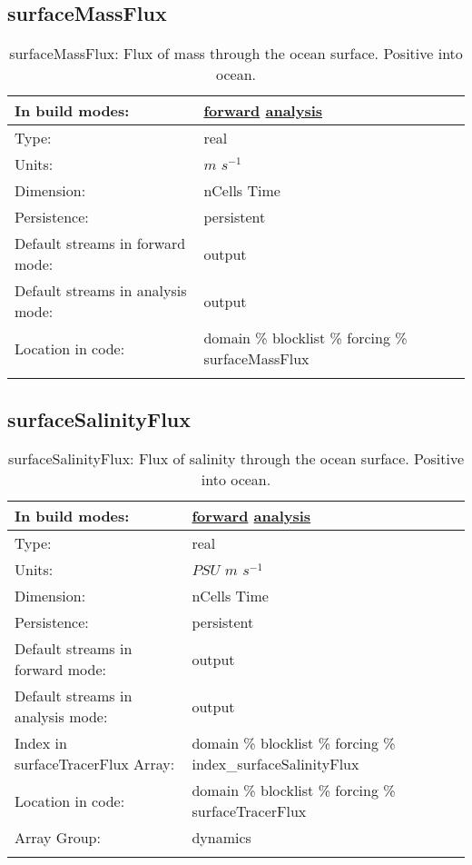 \subsection[surfaceMassFlux]{surfaceMassFlux}
\label{subsec:var_sec_forcing_surfaceMassFlux}
\begin{center}
\begin{longtable}{| p{2.0in} | p{4.0in} |}
        \hline 
        In build modes: & \hyperref[subsec:forward_var_tab_forcing]{forward} \hyperref[subsec:analysis_var_tab_forcing]{analysis} \\
        \hline 
        Type: & real \\
        \hline 
        Units: & $m$ $s^{-1}$ \\
        \hline 
        Dimension: & nCells Time \\
        \hline 
        Persistence: & persistent \\
        \hline 
		 Default streams in forward mode: &  output \\
        \hline 
		 Default streams in analysis mode: &  output \\
        \hline 
		 Location in code: & domain \% blocklist \% forcing \% surfaceMassFlux \\
		 \hline 
    \caption{surfaceMassFlux: Flux of mass through the ocean surface. Positive into ocean.}
\end{longtable}
\end{center}
\subsection[surfaceSalinityFlux]{surfaceSalinityFlux}
\label{subsec:var_sec_forcing_surfaceSalinityFlux}
\begin{center}
\begin{longtable}{| p{2.0in} | p{4.0in} |}
        \hline 
        In build modes: & \hyperref[subsec:forward_var_tab_forcing]{forward} \hyperref[subsec:analysis_var_tab_forcing]{analysis} \\
        \hline 
        Type: & real \\
        \hline 
        Units: & $PSU$ $m$ $s^{-1}$ \\
        \hline 
        Dimension: & nCells Time \\
        \hline 
        Persistence: & persistent \\
        \hline 
		 Default streams in forward mode: &  output \\
        \hline 
		 Default streams in analysis mode: &  output \\
        \hline 
		 Index in surfaceTracerFlux Array: & domain \% blocklist \% forcing \% index\_surfaceSalinityFlux \\
		 \hline 
		 Location in code: & domain \% blocklist \% forcing \% surfaceTracerFlux \\
		 \hline 
		 Array Group: & dynamics \\
		 \hline 
    \caption{surfaceSalinityFlux: Flux of salinity through the ocean surface. Positive into ocean.}
\end{longtable}
\end{center}
